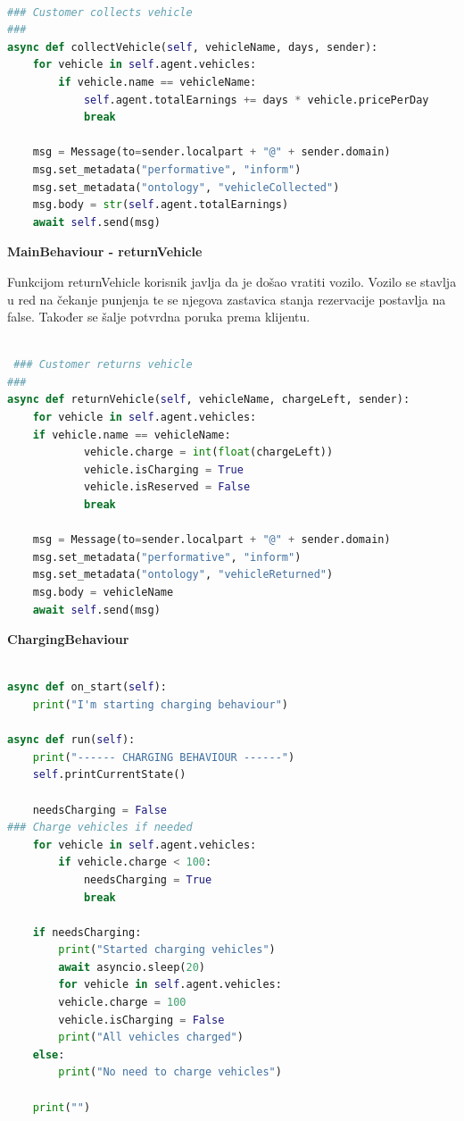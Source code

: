 \documentclass{foi}
\begin{document}
\begin{lstlisting}[language=Python]

### Customer collects vehicle
###
async def collectVehicle(self, vehicleName, days, sender):
	for vehicle in self.agent.vehicles:
		if vehicle.name == vehicleName:
			self.agent.totalEarnings += days * vehicle.pricePerDay
			break
	
	msg = Message(to=sender.localpart + "@" + sender.domain)
	msg.set_metadata("performative", "inform")
	msg.set_metadata("ontology", "vehicleCollected")
	msg.body = str(self.agent.totalEarnings)
	await self.send(msg)

\end{lstlisting}

\begin{flushleft}\textbf{MainBehaviour - returnVehicle}\end{flushleft}

Funkcijom returnVehicle korisnik javlja da je došao vratiti vozilo. Vozilo se stavlja u red na čekanje punjenja te se njegova zastavica stanja rezervacije postavlja na false. Također se šalje potvrdna poruka prema klijentu.

\begin{lstlisting}[language=Python]

 ### Customer returns vehicle
###
async def returnVehicle(self, vehicleName, chargeLeft, sender):
	for vehicle in self.agent.vehicles:
	if vehicle.name == vehicleName:
			vehicle.charge = int(float(chargeLeft))
			vehicle.isCharging = True
			vehicle.isReserved = False
			break
	
	msg = Message(to=sender.localpart + "@" + sender.domain)
	msg.set_metadata("performative", "inform")
	msg.set_metadata("ontology", "vehicleReturned")
	msg.body = vehicleName
	await self.send(msg)

\end{lstlisting}

\begin{flushleft}\textbf{ChargingBehaviour}\end{flushleft}

\begin{lstlisting}[language=Python]

async def on_start(self):
	print("I'm starting charging behaviour")

async def run(self):
	print("------ CHARGING BEHAVIOUR ------")
	self.printCurrentState()

	needsCharging = False
### Charge vehicles if needed
	for vehicle in self.agent.vehicles:
		if vehicle.charge < 100:
			needsCharging = True
			break
	
	if needsCharging:
		print("Started charging vehicles")
		await asyncio.sleep(20)
		for vehicle in self.agent.vehicles:
		vehicle.charge = 100
		vehicle.isCharging = False
		print("All vehicles charged")
	else:
		print("No need to charge vehicles")
	
	print("")

\end{lstlisting}
\end{document}
